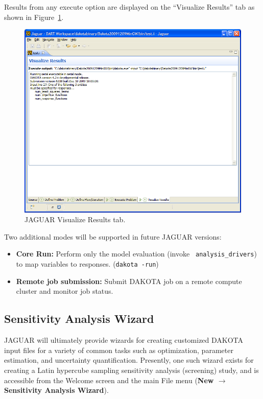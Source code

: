 Results from any execute option are displayed on the ``Visualize
Results'' tab as shown in Figure~\ref{fig:input:jaguar_visualize}.

\begin{figure}
  \centering
  \includegraphics[scale=0.4]{images/jaguar_visualize}
  \caption{JAGUAR Visualize Results tab.}
  \label{fig:input:jaguar_visualize}
\end{figure}

Two additional modes will be supported in future JAGUAR versions:
\begin{itemize} 
\item {\bf Core Run:} Perform only the model evaluation (invoke {\tt
analysis\_drivers}) to map variables to responses.  ({\tt dakota
-run})

\item {\bf Remote job submission:} Submit DAKOTA job on a remote
compute cluster and monitor job status.
\end{itemize}


\subsection{Sensitivity Analysis Wizard}

JAGUAR will ultimately provide wizards for creating customized DAKOTA
input files for a variety of common tasks such as optimization,
parameter estimation, and uncertainty quantification.  Presently, one
such wizard exists for creating a Latin hypercube sampling sensitivity
analysis (screening) study, and is accessible from the Welcome screen
and the main File menu ({\bf New $\rightarrow$ Sensitivity Analysis
Wizard}).

